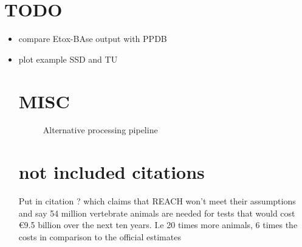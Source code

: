 \documentclass[english]{article}
\begin{document}
\pagebreak
\section*{TODO}

\begin{itemize}

\item compare Etox-BAse output with PPDB

\item plot example SSD and TU

\pagebreak
\section*{MISC}

\begin{figure}
    
    \caption{Alternative processing pipeline}
    \label{fig:pipeline-tree}
\end{figure}

\section*{not included citations}
Put in citation \citep{hartung_chemical_2009} ? which claims that REACH won't meet their assumptions and say 54 million vertebrate animals are needed for tests that would cost €9.5 billion over the next ten years. I.e 20 times more animals, 6 times the costs in comparison to the official estimates 


\end{itemize}
\end{document}
